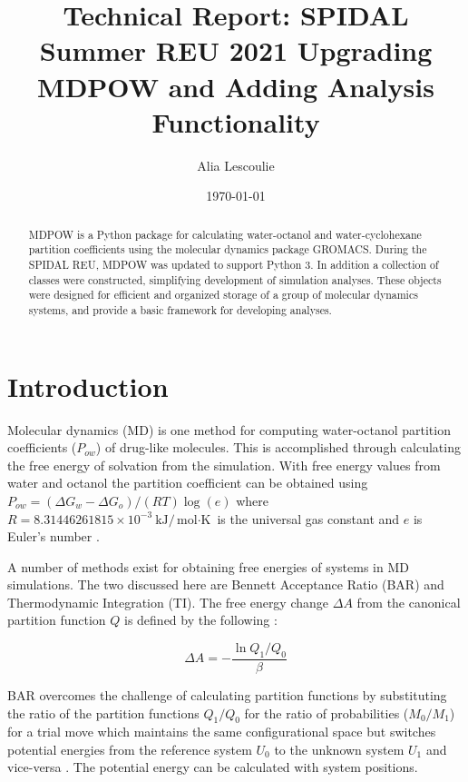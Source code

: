 \documentclass{article}[letterpaper, margins=1in, 12pt]
\title{Technical Report: SPIDAL Summer REU 2021 Upgrading MDPOW and Adding Analysis Functionality}
\date{\today}
\author{Alia Lescoulie}
\affil{Department of Chemistry and Biochemistry, College of Science and Mathematics, California Polytechnic State University, San Luis Obispo, CA, 93407}
\begin{document}
\maketitle

\begin{abstract}
MDPOW is a Python package for calculating water-octanol and water-cyclohexane partition coefficients using the molecular dynamics package GROMACS. During the SPIDAL REU, MDPOW was updated to support Python 3. In addition a collection of classes were constructed, simplifying development of simulation analyses. These objects were designed for efficient and organized storage of a group of molecular dynamics systems, and provide a basic framework for developing analyses.
\end{abstract}

\section{Introduction}
Molecular dynamics (MD) is one method for computing water-octanol partition coefficients ($P_{ow}$) of drug-like molecules. This is accomplished through calculating the free energy of solvation from the simulation. With free energy values from water and octanol the partition coefficient can be obtained using $P_{ow} = {(\Delta G_w - \Delta G_o)}/{(RT)} \log(e)$ where $R=8.31446261815 \times 10^{-3} \: \text{{kJ}}/{ \text{mol} \cdot \text{K}}$ is the universal gas constant and $e$ is Euler's number \cite{fan_precise_2021}.

A number of methods exist for obtaining free energies of systems in MD simulations. The two discussed here are Bennett Acceptance Ratio (BAR) and Thermodynamic Integration (TI). The free energy change $\Delta A$ from the canonical partition function $Q$ is defined by the following \cite{chipot_free_2007}:

\begin{equation}
\Delta A = - \frac{\ln{Q_1 / Q_0}}{\beta}
\end{equation}

BAR overcomes the challenge of calculating partition functions by substituting the ratio of the partition functions $Q_1 / Q_0$ for the ratio of probabilities ($M_0 / M_1$) for a trial move which maintains the same configurational space but switches potential energies from the reference system $U_0$ to the unknown system $U_1$ and vice-versa \cite{bennett_efficient_1976}. The potential energy can be calculated with system positions.
\end{document}

